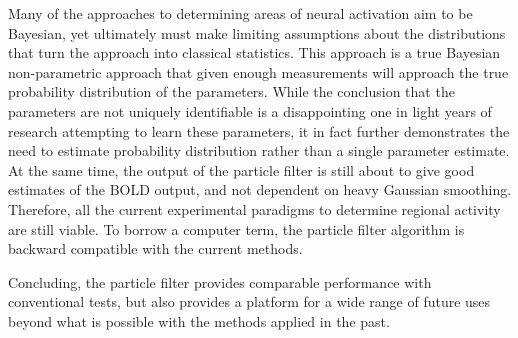 Many of the approaches to determining areas of neural activation aim
to be Bayesian, yet ultimately must make limiting assumptions about
the distributions that turn the approach into classical statistics. 
This approach is a true Bayesian non-parametric approach that given
enough measurements will approach the true probability distribution
of the parameters. While the conclusion that the parameters are not
uniquely identifiable is a disappointing one in light years of research 
attempting to learn these parameters, it in fact further demonstrates
the need to estimate probability distribution rather than a single 
parameter estimate. At the same time, the output of the particle filter
is still about to give good estimates of the BOLD output, and not
dependent on heavy Gaussian smoothing. Therefore, all the current 
experimental paradigms to determine regional activity are still viable.
To borrow a computer term, the particle filter algorithm is backward 
compatible with the current methods. 

Concluding, the particle filter provides comparable performance with
conventional tests, but also provides a platform for a wide range of
future uses beyond what is possible with the methods applied in the
past.
